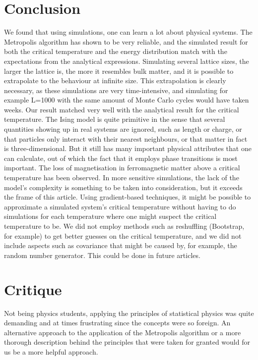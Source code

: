 \documentclass[10pt,a4paper]{article}
\begin{document}
\section{Conclusion}
We found that using simulations, one can learn a lot about physical systems. The Metropolis algorithm has shown to be very reliable, and the simulated result for both the critical temperature and the energy distribution match with the expectations from the analytical expressions. Simulating several lattice sizes, the larger the lattice is, the more it resembles bulk matter, and it is possible to extrapolate to the behaviour at infinite size. This extrapolation is clearly necessary, as these simulations are very time-intensive, and simulating for example L=1000 with the same amount of Monte Carlo cycles would have taken weeks. Our result matched very well with the analytical result for the critical temperature. The Ising model is quite primitive in the sense that several quantities showing up in real systems are ignored, such as length or charge, or that particles only interact with their nearest neighbours, or that matter in fact is three-dimensional. But it still has many important physical attributes that one can calculate, out of which the fact that it employs phase transitions is most important. The loss of magnetisation in ferromagnetic matter above a critical temperature has been observed. In more sensitive simulations, the lack of the model's complexity is something to be taken into consideration, but it exceeds the frame of this article. Using gradient-based techniques, it might be possible to approximate a simulated system's critical temperature without having to do simulations for each temperature where one might suspect the critical temperature to be. 
We did not employ methods such as reshuffling (Bootstrap, for example) to get better guesses on the critical temperature, and we did not include aspects such as covariance that might be caused by, for example, the random number generator. This could be done in future articles.

\section{Critique}
Not being physics students, applying the principles of statistical physics was quite demanding and at times frustrating since the concepts were so foreign. An alternative approach to the application of the Metropolis algorithm or a more thorough description behind the principles that were taken for granted would for us be a more helpful approach.
\end{document}
